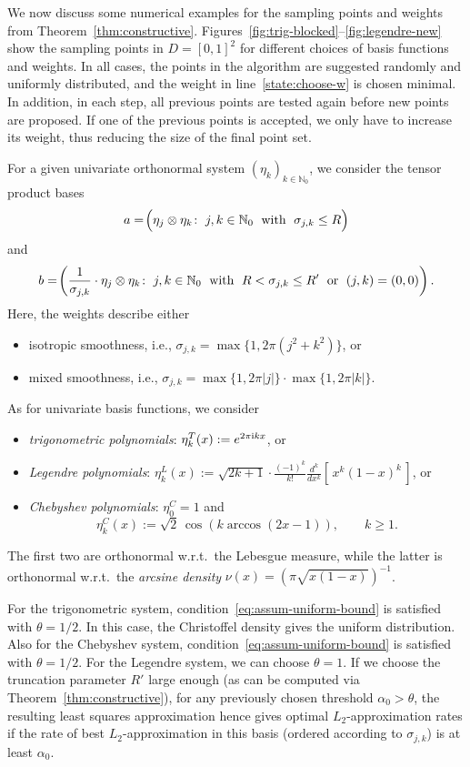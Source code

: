 \documentclass[a4paper,11pt]{article}
\renewcommand{\(}{\left (}
\renewcommand{\)}{\right )}
\newcommand{\<}{\langle}
\renewcommand{\>}{\rangle}
\newcommand{\N}{\mathbb{N}}
\newcommand{\co}{\colon}
\newcommand{\bbrackets}[1]{\!\left(\rule{0pt}{11pt} #1\right)}
\theoremstyle{definition}
\begin{document}
We now discuss some numerical examples
for the sampling points and weights 
from Theorem~\ref{thm:constructive}.
Figures~\ref{fig:trig-blocked}--\ref{fig:legendre-new} show the sampling points in $D=[0,1]^2$ 
for different choices of basis functions and weights.
In all cases, the points in the algorithm are suggested randomly and uniformly distributed, 
and the weight in line~\ref{state:choose-w} is chosen minimal. 
In addition, in each step, 
all previous points are tested again before new points are proposed. 
If one of the previous points is accepted, we only have to increase its weight,
thus reducing the size of the final point set.

For a given univariate orthonormal system $(\eta_k)_{k\in\N_0}$, 
we consider the tensor product bases 
\[
a=\bbrackets{\eta_j\otimes \eta_k\co\; j,k \in\N_0 
\;\text{ with } \;\sigma_{j,k} \leq R }
\]
and 
\[
b=\bbrackets{\frac{1}{\sigma_{j,k}}\cdot \eta_j\otimes \eta_k\co\; j,k\in \N_0
\;\text{ with } \; R<\sigma_{j,k} \leq R' 
\;\text{ or }\; (j,k)=(0,0)}.
\] 
Here, the weights describe either
\begin{itemize}
    \item isotropic smoothness, i.e., $\sigma_{j,k}=\max\{1,2\pi(j^2+k^2)\}$, or 
    \item mixed smoothness, i.e., $\sigma_{j,k}=\max\{1,2\pi|j|\}\cdot\max\{1,2\pi|k|\}$.
\end{itemize}
As for univariate basis functions, we consider 
\begin{itemize}
    \item \emph{trigonometric polynomials}: $\eta_k^T(x):=e^{2\pi{\rm i}k x}$, or
    \item \emph{Legendre polynomials}: 
    $\displaystyle \eta_k^L(x) := \sqrt{2k+1}\cdot \frac{(-1)^k}{k!} \frac{d^k}{dx^k} \left[\, x^k (1 - x)^k \,\right]$, or
    \item \emph{Chebyshev polynomials}: $\eta_0^C=1$ and 
    \[
    \eta^C_k(x) := \sqrt{2}\,\cos(k \arccos(2x-1)), \qquad k\ge1.
    \]
\end{itemize}
The first two are orthonormal 
w.r.t.~the Lebesgue measure, 
while the latter is orthonormal w.r.t.~the \emph{arcsine density} $\nu(x)=(\pi \sqrt{x(1-x)})^{-1}$.

For the trigonometric system, condition~\eqref{eq:assum-uniform-bound} is satisfied with $\theta = 1/2$. 
In this case, the Christoffel density gives the uniform distribution. 
Also for the Chebyshev system, condition~\eqref{eq:assum-uniform-bound} is satisfied with $\theta = 1/2$. 
For the Legendre system, we can choose $\theta=1$.
If we choose the truncation parameter $R'$ large enough 
(as can be computed via Theorem~\ref{thm:constructive}), 
for any previously chosen threshold $\alpha_0>\theta$,
the resulting least squares approximation hence gives 
optimal $L_2$-approximation rates
if the rate of best $L_2$-approximation in this basis
(ordered according to $\sigma_{j,k}$)
is at least $\alpha_0$.
\end{document}
